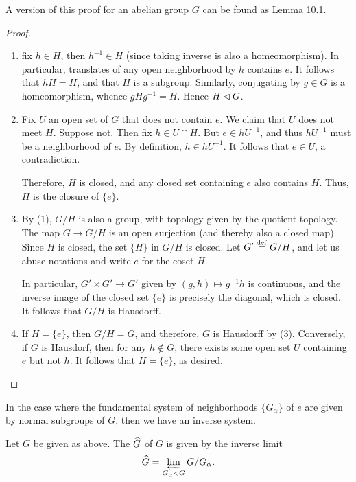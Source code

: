 A version of this proof for an abelian group $G$ can be found as
\cite{AM} Lemma 10.1.

\begin{proof}
\begin{enumerate}
\item fix $h \in H$, then $h^{-1} \in H$ (since taking inverse is 
also a homeomorphism). In particular, translates of any open 
neighborhood by $h$ contains $e$. It follows that $hH = H$, and 
that $H$ is a subgroup. Similarly, conjugating by $g \in G$ is a 
homeomorphism, whence $gHg^{-1} = H$. Hence $H \lhd G$.

\item Fix $U$ an open set of $G$ that does not contain $e$. We
claim that $U$ does not meet $H$. Suppose not. Then fix $h \in U 
\cap H$. But $e \in hU^{-1}$, and thus $hU^{-1}$ must be a 
neighborhood of $e$. By definition, $h \in hU^{-1}$. It follows
that $e \in U$, a contradiction.

Therefore, $H$ is closed, and any closed set containing $e$
also contains $H$. Thus, $H$ is the closure of $\{e\}$.

\item By (1), $G/H$ is also a group, with topology given by the
quotient topology. The map $G \to G/H$ is an open surjection (and 
thereby also a closed map). Since $H$ is closed, the set $\{H\}$ 
in $G/H$ is closed. Let $G' \stackrel{\mathrm{def}}{=} G/H$, and let us abuse 
notations and write $e$ for the coset $H$.

In particular, $G' \times G' \to G'$ given by $(g, h) \mapsto 
g^{-1}h$ is continuous, and the inverse image of the closed set 
$\{e\}$ is precisely the diagonal, which is closed. It follows 
that $G/H$ is Hausdorff.

\item If $H = \{e\}$, then $G/H = G$, and therefore, $G$ is Hausdorff
by (3). Conversely, if $G$ is Hausdorf, then for any $h \notin G$,
there exists some open set $U$ containing $e$ but not $h$. It
follows that $H = \{e\}$, as desired.
\end{enumerate}
\end{proof}

In the case where the fundamental system of neighborhoods 
$\{G_\alpha\}$ of $e$ are given by normal subgroups of $G$, then 
we have an inverse system.

\begin{defn}
Let $G$ be given as above. The 
$\widehat{G}$ of $G$ is given by the inverse limit
\[
\widehat{G} = \varprojlim_{G_\alpha < G} G/G_\alpha.
\]
\end{defn}


